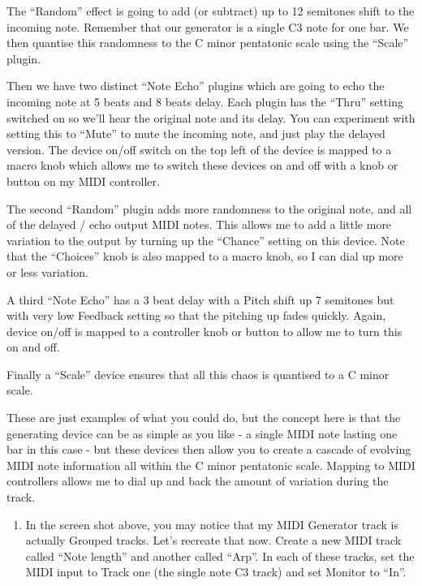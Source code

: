 \documentclass[
  12pt,
  letterpaper,
  oneside,
  open=any]{scrbook}
\providecommand{\tightlist}{%
  \setlength{\itemsep}{0pt}\setlength{\parskip}{0pt}}\usepackage{longtable,booktabs,array}
\begin{document}
The ``Random'' effect is going to add (or subtract) up to 12 semitones
shift to the incoming note. Remember that our generator is a single C3
note for one bar. We then quantise this randomness to the C minor
pentatonic scale using the ``Scale'' plugin.

Then we have two distinct ``Note Echo'' plugins which are going to echo
the incoming note at 5 beats and 8 beats delay. Each plugin has the
``Thru'' setting switched on so we'll hear the original note and its
delay. You can experiment with setting this to ``Mute'' to mute the
incoming note, and just play the delayed version. The device on/off
switch on the top left of the device is mapped to a macro knob which
allows me to switch these devices on and off with a knob or button on my
MIDI controller.

The second ``Random'' plugin adds more randomness to the original note,
and all of the delayed / echo output MIDI notes. This allows me to add a
little more variation to the output by turning up the ``Chance'' setting
on this device. Note that the ``Choices'' knob is also mapped to a macro
knob, so I can dial up more or less variation.

A third ``Note Echo'' has a 3 beat delay with a Pitch shift up 7
semitones but with very low Feedback setting so that the pitching up
fades quickly. Again, device on/off is mapped to a controller knob or
button to allow me to turn this on and off.

Finally a ``Scale'' device ensures that all this chaos is quantised to a
C minor scale.

These are just examples of what you could do, but the concept here is
that the generating device can be as simple as you like - a single MIDI
note lasting one bar in this case - but these devices then allow you to
create a cascade of evolving MIDI note information all within the C
minor pentatonic scale. Mapping to MIDI controllers allows me to dial up
and back the amount of variation during the track.

\begin{enumerate}
\def\labelenumi{\arabic{enumi}.}
\setcounter{enumi}{6}
\tightlist
\item
  In the screen shot above, you may notice that my MIDI Generator track
  is actually Grouped tracks. Let's recreate that now. Create a new MIDI
  track called ``Note length'' and another called ``Arp''. In each of
  these tracks, set the MIDI input to Track one (the single note C3
  track) and set Monitor to ``In''.
\end{enumerate}
\end{document}
